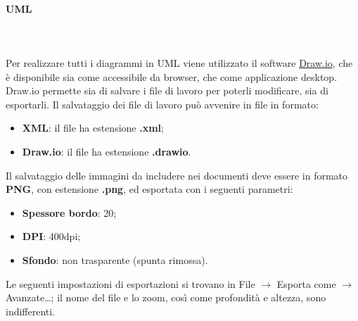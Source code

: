 \paragraph{UML}\mbox{}\\ \\
Per realizzare tutti i diagrammi in UML viene utilizzato il software \href{https://draw.io}{Draw.io}, che è disponibile sia come  accessibile da browser, che come applicazione desktop.
Draw.io permette sia di salvare i file di lavoro per poterli modificare, sia di esportarli.
Il salvataggio dei file di lavoro può avvenire in file in formato:
\begin{itemize}
    \item \textbf{XML}: il file ha estensione \textbf{.xml};
    \item \textbf{Draw.io}: il file ha estensione \textbf{.drawio}.
\end{itemize}
Il salvataggio delle immagini da includere nei documenti deve essere in formato \textbf{PNG}, con estensione \textbf{.png}, ed esportata con i seguenti parametri:
\begin{itemize}
    \item \textbf{Spessore bordo}: 20;
    \item \textbf{DPI}: 400dpi;
    \item \textbf{Sfondo}: non trasparente (spunta rimossa).
\end{itemize}
Le seguenti impostazioni di esportazioni si trovano in File $\rightarrow$ Esporta come $\rightarrow$ Avanzate\dots; il nome del file e lo zoom, così come profondità e altezza, sono indifferenti.
